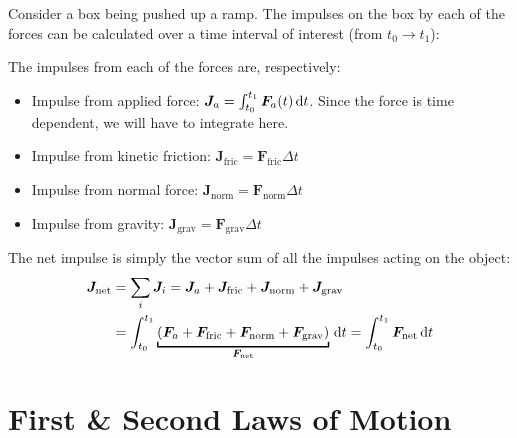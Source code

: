 \begin{example}
  Consider a box being pushed up a ramp. The impulses on the box by each of the
  forces can be calculated over a time interval of interest (from $t_0\to t_1$):
  \begin{center}
  \end{center}
  The impulses from each of the forces are, respectively:
  \begin{itemize}[itemsep=6pt]
  \item Impulse from applied force: $\bm J_a =\int_{t_0}^{t_1}\bm F_a(t)\dl t$.
    Since the force is time dependent, we will have to integrate here.
  \item Impulse from kinetic friction:
    $\bm J_\text{fric}=\bm F_\text{fric}\Delta t$
  \item Impulse from normal force:
    $\bm J_\text{norm} =\bm F_\text{norm}\Delta t$
  \item Impulse from gravity: $\bm J_\text{grav}=\bm F_\text{grav}\Delta t$
  \end{itemize}
  The net impulse is simply the vector sum of all the impulses acting on the
  object:
  \begin{align*}
    \bm J_\text{net} &=
    \sum_i\bm J_i=\bm J_a+\bm J_\text{fric}+\bm J_\text{norm}+\bm J_\text{grav}\\
    &=\int_{t_0}^{t_1}
    \underbracket[1pt]{
      (\bm F_a+\bm F_\text{fric}+\bm F_\text{norm}+\bm F_\text{grav})
    }_{\bm F_\text{net}}\dl t= \int_{t_0}^{t_1}\bm F_\text{net}\dl t
  \end{align*}
\end{example}




\section{First \& Second Laws of Motion}


